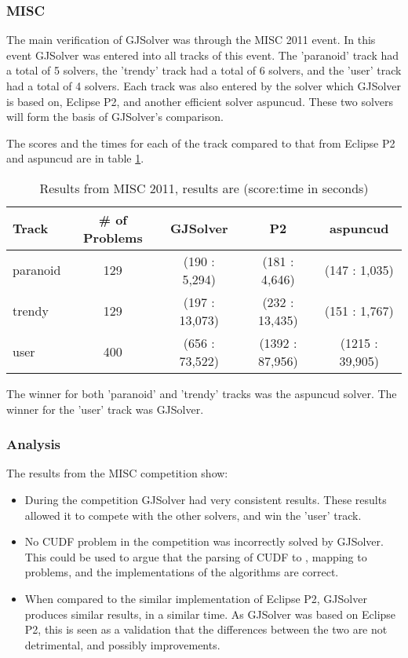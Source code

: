 \subsubsection{MISC}
The main verification of GJSolver was through the MISC 2011 event.
In this event GJSolver was entered into all tracks of this event.
The 'paranoid' track had a total of 5 solvers, the 'trendy' track had a total of 6 solvers, 
and the 'user' track had a total of 4 solvers.
Each track was also entered by the solver which GJSolver is based on, Eclipse P2, and another efficient solver aspuncud.
These two solvers will form the basis of GJSolver's comparison.

The scores and the times for each of the track compared to that from Eclipse P2 and aspuncud are in table \ref{impl.misc2011}.
\begin{table}
\begin{tabular}{| l | c | c | c | c |}\hline
Track & \# of Problems & GJSolver & P2 & aspuncud\\ \hline
paranoid & 129 & (190 : 5,294) & (181 : 4,646) & (147 : 1,035) \\ \hline
trendy & 129 & (197 : 13,073) & (232 : 13,435) & (151 : 1,767) \\ \hline
user & 400 & (656 : 73,522) & (1392 : 87,956) & (1215 : 39,905) \\ \hline
\end{tabular}
\caption{Results from MISC 2011, results are (score:time in seconds)}
\label{impl.misc2011}
\end{table}

The winner for both 'paranoid' and 'trendy' tracks was the aspuncud solver.
The winner for the 'user' track was GJSolver.

\subsubsection{Analysis}
The results from the MISC competition show:
\begin{itemize}
  \item During the competition GJSolver had very consistent results.
These results allowed it to compete with the other solvers, and win the 'user' track.
 \item No CUDF problem in the competition was incorrectly solved by GJSolver. 
 This could be used to argue that the parsing of CUDF to \modelname, mapping to \modelimpl problems, and the implementations of the algorithms are correct.
 \item When compared to the similar implementation of Eclipse P2, GJSolver produces similar results, in a similar time. 
 As GJSolver was based on Eclipse P2, this is seen as a validation that the differences between the two are not detrimental, and possibly improvements. 
\end{itemize}

